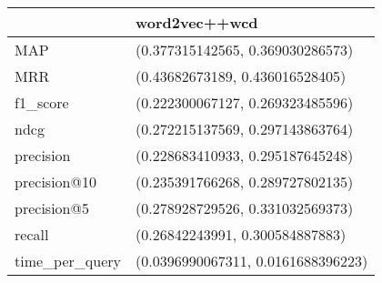 \begin{tabular}{ll}
\toprule
{} &                       word2vec++wcd \\
\midrule
MAP            &    (0.377315142565, 0.369030286573) \\
MRR            &     (0.43682673189, 0.436016528405) \\
f1\_score       &    (0.222300067127, 0.269323485596) \\
ndcg           &    (0.272215137569, 0.297143863764) \\
precision      &    (0.228683410933, 0.295187645248) \\
precision@10   &    (0.235391766268, 0.289727802135) \\
precision@5    &    (0.278928729526, 0.331032569373) \\
recall         &     (0.26842243991, 0.300584887883) \\
time\_per\_query &  (0.0396990067311, 0.0161688396223) \\
\bottomrule
\end{tabular}
